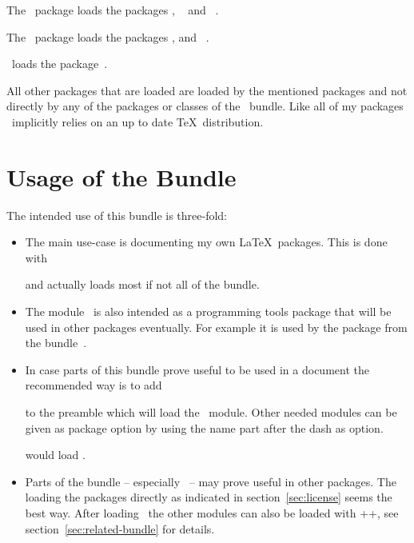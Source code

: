 \documentclass[load-preamble+]{cnltx-doc}
\begin{document}
The \cnltxlistings\ package loads the packages \cnltxbase,
~\cite{pkg:listings} and
~\cite{pkg:catchfile}.

The \cnltxtools\ package loads the packages \cnltxbase, \cnltxtranslations and
\oberdiekfn~\cite{pkg:accsupp}.

\cnltxtranslations\ loads the 
package~\cite{pkg:translations}.

All other packages that are loaded are loaded by the mentioned packages and
not directly by any of the packages or classes of the \cnltx\ bundle.  Like
all of my packages \cnltx\ implicitly relies on an up to date \TeX\
distribution.

\section{Usage of the Bundle}\label{sec:usage-bundle}
The intended use of this bundle is three-fold:
\begin{itemize}
  \item The main use-case is documenting my own \LaTeX\ packages.  This is
    done with
    \begin{sourcecode}[gobble=6]
      \documentclass{cnltx-doc}
    \end{sourcecode}
    and actually loads most if not all of the bundle.
  \item The module \cnltxbase\ is also intended as a programming tools package
    that will be used in other packages eventually.  For example it is used by
    the \pkg{cntformats} package from the \bnd{exsheets}
    bundle~\cite{bnd:exsheets}.
  \item In case parts of this bundle prove useful to be used in a document the
    recommended way is to add
    \begin{sourcecode}[gobble=6]
      \usepackage{cnltx}
    \end{sourcecode}
    to the preamble which will load the \cnltxbase\ module.  Other needed
    modules can be given as package option by using the name part after the
    dash as option.
    \begin{sourcecode}[gobble=6]
      \usepackage[example]{cnltx}
    \end{sourcecode}
    would load \cnltxexample.
  \item Parts of the bundle -- especially \cnltxbase\ -- may prove useful in
    other packages.  The loading the packages directly as indicated in
    section~\ref{sec:license} seems the best way.  After loading \cnltxbase\
    the other modules can also be loaded with \verbcode+\cnltx@load@module+,
    see section~\ref{sec:related-bundle} for details.
\end{itemize}
\end{document}
